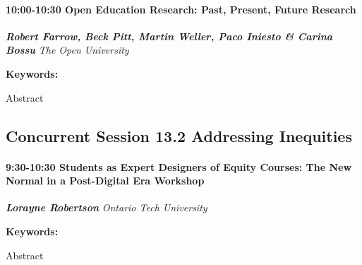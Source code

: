 \documentclass[
]{book}
\begin{document}
\begin{session}
\hypertarget{open-education-research-past-present-future-research}{%
\paragraph*{\texorpdfstring{10:00-10:30 \textbar{} \textbf{Open
Education Research: Past, Present, Future} \textbar{}
Research}{10:00-10:30 \textbar{} Open Education Research: Past, Present, Future \textbar{} Research}}\label{open-education-research-past-present-future-research}}

\textbf{\emph{Robert Farrow, Beck Pitt, Martin Weller, Paco Iniesto \&
Carina Bossu}} \textbar{} \emph{The Open University}

\textbf{Keywords:}

Abstract
\end{session}

\hypertarget{concurrent-session-13.2-addressing-inequities}{%
\subsection*{Concurrent Session 13.2 \textbar{} Addressing Inequities}\label{concurrent-session-13.2-addressing-inequities}}

\begin{workshop}
\hypertarget{students-as-expert-designers-of-equity-courses-the-new-normal-in-a-post-digital-era-workshop}{%
\paragraph*{\texorpdfstring{9:30-10:30 \textbar{} \textbf{Students as
Expert Designers of Equity Courses: The New Normal in a Post-Digital
Era} \textbar{}
Workshop}{9:30-10:30 \textbar{} Students as Expert Designers of Equity Courses: The New Normal in a Post-Digital Era \textbar{} Workshop}}\label{students-as-expert-designers-of-equity-courses-the-new-normal-in-a-post-digital-era-workshop}}

\textbf{\emph{Lorayne Robertson}} \textbar{} \emph{Ontario Tech
University}

\textbf{Keywords:}

Abstract
\end{workshop}
\end{document}
